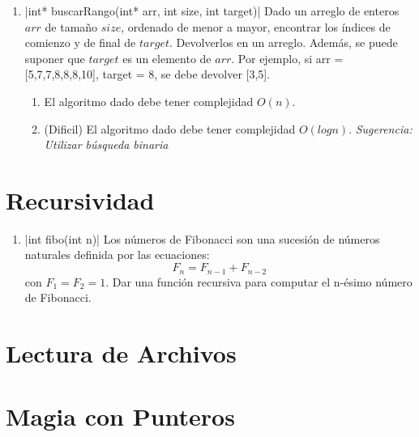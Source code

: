 \documentclass[titlepage,oneside]{book}
\begin{document}
\begin{enumerate}
    \item{}|int* buscarRango(int* arr, int size, int target)|
    Dado un arreglo de enteros $arr$ de tamaño $size$, ordenado de menor a mayor, encontrar los índices de comienzo y de final de $target$. Devolverlos en un arreglo. Además, se puede suponer que $target$ es un elemento de $arr$.
    \newline
    Por ejemplo, si arr = [5,7,7,8,8,8,10], target = 8, se debe devolver [3,5].
    \begin{enumerate}
        \item El algoritmo dado debe tener complejidad $O(n)$.
        \item (Dificil) El algoritmo dado debe tener complejidad $O(log{}n)$.\newline
        \textit{Sugerencia: Utilizar búsqueda binaria}
    \end{enumerate}
    
    
\end{enumerate}


\chapter{Recursividad}

    \begin{enumerate}
    
        \item{}|int fibo(int n)|
        Los números de Fibonacci son una sucesión de números naturales definida por las ecuaciones:
        $$F_n = F_{n-1} + F_{n-2}$$ con $F_1 = F_2 = 1$. Dar una función recursiva para computar el n-ésimo número de Fibonacci.

        
        
    \end{enumerate}
    

\chapter{Lectura de Archivos}

\chapter{Magia con Punteros}
\end{document}
